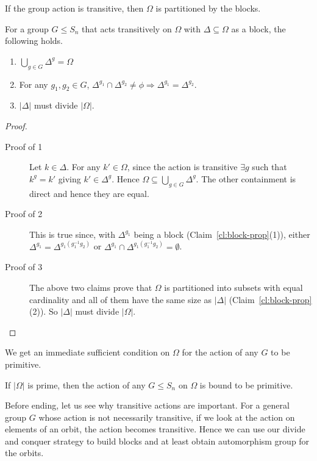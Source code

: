If the group action is transitive, then $\Omega$ is partitioned by the
blocks.
\begin{claim} For a group $G \le S_n$ that acts transitively on $\Omega$ with
	$\Delta \subseteq \Omega$ as a block, the following holds.
	\begin{enumerate}
		\item $\bigcup_{g \in G} \Delta^g = \Omega$
		\item For any $g_1, g_2 \in G$,  $\Delta^{g_1} \cap
			\Delta^{g_2} \ne \phi \Rightarrow \Delta^{g_1} =
			\Delta^{g_2}$.  
		\item $|\Delta|$ must divide $|\Omega|$.
	\end{enumerate}
\end{claim}
\begin{proof}
	\begin{description}
		\item[Proof of 1] 
Let $k \in \Delta$. For any $k' \in \Omega$, since the action is transitive
$\exists g$ such that  $k^g = k'$ giving $k' \in \Delta^g$. Hence $\Omega
\subseteq \bigcup_{g \in G} \Delta^g $. The other containment is direct and
hence they are equal.
		\item[Proof of 2]
		This is true since, with $\Delta^{g_1}$ being a block
		(Claim~\ref{cl:block-prop}(1)), either $\Delta^{g_1} =
		\Delta^{g_1(g_1^{-1}g_2)}$ or  $\Delta^{g_1} \cap
		\Delta^{g_1(g_1^{-1}g_2)} = \emptyset$.
	\item[Proof of 3] The above two claims prove that $\Omega$ is partitioned
		into subsets with equal cardinality and all of them have the
		same size as $|\Delta|$ (Claim~\ref{cl:block-prop}(2)). So
		$|\Delta|$ must divide $|\Omega|$.  \end{description}
\end{proof}

We get an immediate sufficient condition on $\Omega$ for the action of any 
$G$ to be primitive. 
\begin{corollary}
	If $|\Omega |$ is prime, then the action of any $G \le S_n$ on
	$\Omega$ is bound to be primitive.  
\end{corollary}

Before ending, let us see why transitive actions are important. For a general
group $G$ whose action is not necessarily transitive, if we look at the
action on elements of an orbit, the action becomes transitive. Hence we can
use our divide and conquer strategy to build blocks and at least obtain
automorphism group for the orbits.

